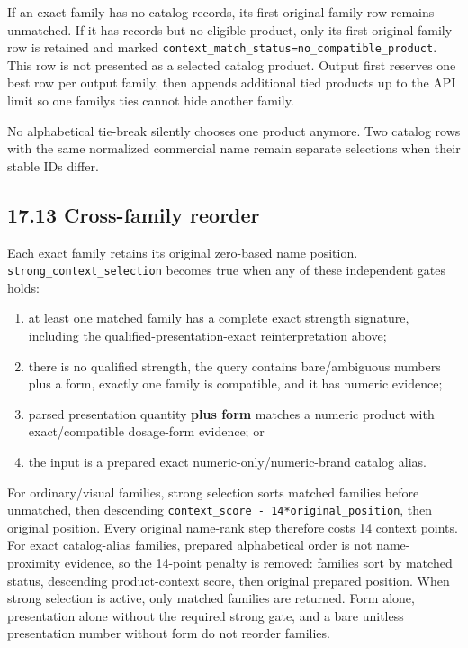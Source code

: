 If an exact family has no catalog records, its first original family row remains unmatched. If it has records but no eligible product, only its first original family row is retained and marked \texttt{context\_\allowbreak{}match\_\allowbreak{}status=no\_\allowbreak{}compatible\_\allowbreak{}product}. This row is not presented as a selected catalog product. Output first reserves one best row per output family, then appends additional tied products up to the API limit so one family\textquotesingle s ties cannot hide another family.

No alphabetical tie-break silently chooses one product anymore. Two catalog rows with the same normalized commercial name remain separate selections when their stable IDs differ.

\subsection{17.13 Cross-family reorder}\label{1713-cross-family-reorder}

Each exact family retains its original zero-based name position. \texttt{strong\_\allowbreak{}context\_\allowbreak{}selection} becomes true when any of these independent gates holds:

\begin{enumerate}
\def\labelenumi{\arabic{enumi}.}
\tightlist
\item
  at least one matched family has a complete exact strength signature, including the qualified-presentation-exact reinterpretation above;
\item
  there is no qualified strength, the query contains bare/ambiguous numbers plus a form, exactly one family is compatible, and it has numeric evidence;
\item
  parsed presentation quantity \textbf{plus form} matches a numeric product with exact/compatible dosage-form evidence; or
\item
  the input is a prepared exact numeric-only/numeric-brand catalog alias.
\end{enumerate}

For ordinary/visual families, strong selection sorts matched families before unmatched, then descending \texttt{context\_\allowbreak{}score\ -\ 14*original\_\allowbreak{}position}, then original position. Every original name-rank step therefore costs 14 context points. For exact catalog-alias families, prepared alphabetical order is not name-proximity evidence, so the 14-point penalty is removed: families sort by matched status, descending product-context score, then original prepared position. When strong selection is active, only matched families are returned. Form alone, presentation alone without the required strong gate, and a bare unitless presentation number without form do not reorder families.

